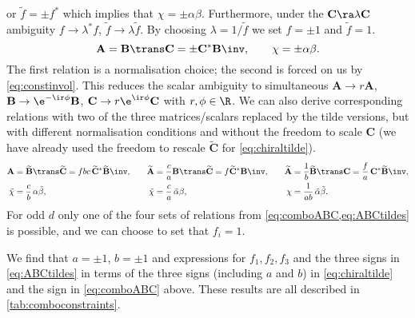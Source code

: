 \documentclass[11pt]{article}
\newcommand{\cc}{^\ast}
\newcommand{\A}{\mathbf{A}}
\newcommand{\B}{\mathbf{B}}
\renewcommand{\C}{\mathbf{C}}
\newcommand{\At}{\widetilde{\A}}
\newcommand{\Bt}{\widetilde{\B}}
\newcommand{\Ct}{\widetilde{\C}}
\newcommand{\alphat}{\tilde{\alpha}}
\newcommand{\betat}{\tilde{\beta}}
\newcommand{\chit}{\tilde{\chi}}
\begin{document}
or \( \tilde{f} = \pm f\cc \) which implies that \(\chi = \pm \alpha \beta\).
Furthermore, under the \(\C \ra \lambda \C\) ambiguity \( f \rightarrow \lambda\cc f\),
\(\tilde{f} \rightarrow \lambda \tilde{f} \).
By choosing \(\lambda = 1/\tilde{f}\) we set \(f = \pm1\) and \(\tilde{f} = 1\).
%
\begin{equation}\label{eq:comboABC}
  \A = \B\trans \C = \pm \C\cc \B\inv, \qquad
  \chi = \pm \alpha \beta.
\end{equation}
%
The first relation is a normalisation choice; the second is forced on us by \cref{eq:constinvol}.
This reduces the scalar ambiguity to simultaneous \( \A \rightarrow r \A \),
\( \B \rightarrow \e^{-\ir\phi} \B \), \( \C \rightarrow r\e^{\ir\phi} \C \)
with \( r, \phi \in \R \).
We can also derive corresponding relations with two of the three matrices/scalars replaced by the tilde versions, 
but with different normalisation conditions and without the freedom to scale \(\C\) 
(we have already used the freedom to rescale \(\Ct\) for \cref{eq:chiraltilde}).
%
\begin{equation}\label{eq:ABCtildes}
\begin{aligned}
  \A  &= \Bt\trans \Ct = fbc\, \Ct\cc \Bt\inv, &\quad
  \At &= \frac{c}{a} \B\trans \Ct  = f \Ct\cc \B\inv, &\quad
  \At &= \frac{1}{b} \Bt\trans \C  = \frac{f}{a}\, \C\cc \Bt\inv, \\
  {\chit} &= \frac{c}{b} \, {\alpha} {\betat}, &
  {\chit} &= \frac{c}{a} \, {\alphat} {\beta}, &
  {\chi}  &= \frac{1}{ab}\, {\alphat} {\betat}.
\end{aligned}
\end{equation}
%
For odd \(d\) only one of the four sets of relations from \cref{eq:comboABC,eq:ABCtildes} is possible, and we can choose to set that \(f_i = 1\).


We find that \(a = \pm 1\), \(b = \pm 1\) and expressions for \(f_1,f_2,f_3\) and the three signs in \cref{eq:ABCtildes} in terms of the three signs (including \(a\) and \(b\)) in \cref{eq:chiraltilde} and the sign in \cref{eq:comboABC} above.
These results are all described in \cref{tab:comboconstraints}.
\end{document}
